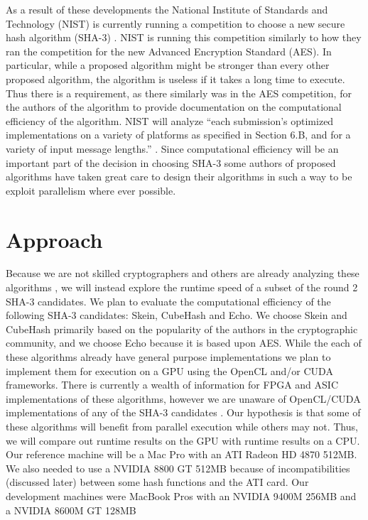 \documentclass{article}
\begin{document}
As a result of these developments the National Institute of Standards and Technology (NIST) is currently running a competition to choose a new secure hash algorithm (SHA-3) \cite{Sha3Request}.
NIST is running this competition similarly to how they ran the competition for the new Advanced Encryption Standard (AES).
In particular, while a proposed algorithm might be stronger than every other proposed algorithm, the algorithm is useless if it takes a long time to execute.
Thus there is a requirement, as there similarly was in the AES competition, for the authors of the algorithm to provide documentation on the computational efficiency of the algorithm.
NIST will analyze ``each submission's optimized implementations on a variety of platforms as specified in Section 6.B, and for a variety of input message lengths.'' \cite{Sha3Request}.
Since computational efficiency will be an important part of the decision in choosing SHA-3 some authors of proposed algorithms have taken great care to design their algorithms in such a way to be exploit parallelism where ever possible.


\section*{Approach}
Because we are not skilled cryptographers and others are already analyzing these algorithms \cite{Sha3Zoo}, we will instead explore the runtime speed of a subset of the round 2 SHA-3 candidates.
We plan to evaluate the computational efficiency of the following SHA-3 candidates: Skein, CubeHash and Echo.
We choose Skein and CubeHash primarily based on the popularity of the authors in the cryptographic community, and we choose Echo because it is based upon AES.
While the each of these algorithms already have general purpose implementations we plan to implement them for execution on a GPU using the OpenCL and/or CUDA frameworks.
There is currently a wealth of information for FPGA and ASIC implementations of these algorithms, however we are unaware of OpenCL/CUDA implementations of any of the SHA-3 candidates \cite{Sha3Hardware}.
Our hypothesis is that some of these algorithms will benefit from parallel execution while others may not.
Thus, we will compare out runtime results on the GPU with runtime results on a CPU.
Our reference machine will be a Mac Pro with an ATI Radeon HD 4870 512MB. 
We also needed to use a NVIDIA 8800 GT 512MB because of incompatibilities (discussed later) between some hash functions and the ATI card.  
Our development machines were MacBook Pros with an NVIDIA 9400M 256MB and a NVIDIA 8600M GT 128MB
 
\end{document}
